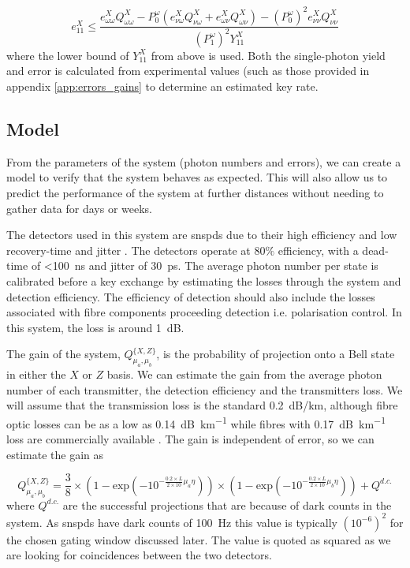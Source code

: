 \begin{equation}
	e^X_{11} \le \frac{e^X_{\omega\omega}Q^X_{\omega\omega} - P^\omega_0\left(e^X_{\nu\omega}Q^X_{\nu\omega} + e^X_{\omega\nu}Q^X_{\omega\nu}\right) - (P^\omega_0)^2e^X_{\nu\nu}Q^X_{\nu\nu}}{(P^\omega_1)^2 Y^X_{11}}
\end{equation}
where the lower bound of $Y^X_{11}$ from above is used. Both the single-photon yield and error is calculated from experimental values (such as those provided in appendix \ref{app:errors_gains} to determine an estimated key rate.



\subsection{Model}

From the parameters of the system (photon numbers and errors), we can create a model to verify that the system behaves as expected. This will also allow us to predict the performance of the system at further distances without needing to gather data for days or weeks. 

The detectors used in this system are \acp{snspd} due to their high efficiency and low recovery-time and jitter \cite{sprengers2011}. The detectors operate at $80\%$ efficiency, with a dead-time of \SI{<100}{ns} and jitter of \SI{30}{ps}. The average photon number per state is calibrated before a key exchange by estimating the losses through the system and detection efficiency. The efficiency of detection should also include the losses associated with fibre components proceeding detection i.e. polarisation control. In this system, the loss is around \SI{1}{dB}.

The gain of the system, $Q^{ \{X,Z\} }_{\mu_a,\mu_b}$, is the probability of projection onto a Bell state in either the $X$ or $Z$ basis. We can estimate the gain from the average photon number of each transmitter, the detection efficiency and the transmitters loss. We will assume that the transmission loss is the standard \SI{0.2}{dB/km}, although fibre optic losses can be as a low as \SI{0.14}{dB\per\km} \cite{tamura2018} while fibres with \SI{0.17}{dB\per\km} loss are commercially available \cite{corningULL}. The gain is independent of error, so we can estimate the gain as 

\begin{equation}
	Q^{ \{X,Z\} }_{\mu_a,\mu_b} = \frac{3}{8} \times \left( 1 - \text{exp} \left( -10^{- \frac{0.2 \times L}{2 \times 10} \mu_a \eta}  \right)  \right) \times \left( 1 - \text{exp} \left( -10^{- \frac{0.2 \times L}{2 \times 10} \mu_b \eta}  \right)  \right) + Q^{d.c.}
\end{equation}
where $Q^{d.c.}$ are the successful projections that are because of dark counts in the system. As \acp{snspd} have dark counts of \SI{100}{Hz} this value is typically $\left(10^{-6}\right)^2$ for the chosen gating window discussed later. The value is quoted as squared as we are looking for coincidences between the two detectors. 

